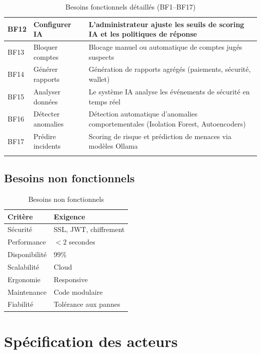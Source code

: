 \documentclass[12pt,a4paper]{report}
\begin{document}
\begin{longtable}{|p{1.2cm}|p{4cm}|p{9cm}|}
\hline
BF12 & Configurer IA & L'administrateur ajuste les seuils de scoring IA et les politiques de réponse \\
\hline
BF13 & Bloquer comptes & Blocage manuel ou automatique de comptes jugés suspects \\
\hline
BF14 & Générer rapports & Génération de rapports agrégés (paiements, sécurité, wallet) \\
\hline
BF15 & Analyser données & Le système IA analyse les événements de sécurité en temps réel \\
\hline
BF16 & Détecter anomalies & Détection automatique d'anomalies comportementales (Isolation Forest, Autoencoders) \\
\hline
BF17 & Prédire incidents & Scoring de risque et prédiction de menaces via modèles Ollama \\
\hline
\caption{Besoins fonctionnels détaillés (BF1--BF17)}
\end{longtable}

\section{Besoins non fonctionnels}
\begin{table}[H]
\centering
\begin{tabular}{|p{4cm}|p{9cm}|}
\hline
\textbf{Critère} & \textbf{Exigence} \\
\hline
Sécurité & SSL, JWT, chiffrement \\
\hline
Performance & $< 2$ secondes \\
\hline
Disponibilité & 99\% \\
\hline
Scalabilité & Cloud \\
\hline
Ergonomie & Responsive \\
\hline
Maintenance & Code modulaire \\
\hline
Fiabilité & Tolérance aux pannes \\
\hline
\end{tabular}
\caption{Besoins non fonctionnels}
\end{table}

\chapter{Spécification des acteurs}
\end{document}
